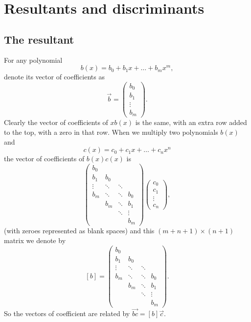 \chapter{Resultants and discriminants}\label{chapter:resultants}

\section{The resultant}

For any polynomial 
\[
b(x) = b_0 + b_1 x + \dots + b_m x^m,
\]
denote its vector of coefficients as
\[
\vec{b}=
\begin{pmatrix}
b_0 \\
b_1 \\
\vdots \\
b_m
\end{pmatrix}.
\]
Clearly the vector of coefficients of \(xb(x)\) is the same, with an extra row added to the top, with a zero in that row.
When we multiply two polynomials \(b(x)\) and
\[
c(x) = c_0 + c_1 x + \dots + c_n x^n
\] 
the vector of coefficients of \(b(x)c(x)\) is
\[
\begin{pmatrix}
b_0 \\
b_1 & b_0 \\
\vdots & \ddots & \ddots \\
b_m & \ddots & \ddots & b_0 \\
    & b_m & \ddots & b_1 \\
    &     & \ddots & \vdots \\
    &    &        & b_m
\end{pmatrix}
\begin{pmatrix}
c_0 \\
c_1 \\
\vdots \\
c_n
\end{pmatrix},
\]
(with zeroes represented as blank spaces) and this \((m+n+1) \times (n+1)\) matrix we denote by
\[
[b]=
\begin{pmatrix}
b_0 \\
b_1 & b_0 \\
\vdots & \ddots & \ddots \\
b_m & \ddots & \ddots & b_0 \\
    & b_m & \ddots & b_1 \\
    &     & \ddots & \vdots \\
    &     &        & b_m
\end{pmatrix}.
\]
So the vectors of coefficient are related by \(\overrightarrow{bc}=[b]\vec{c}\).

